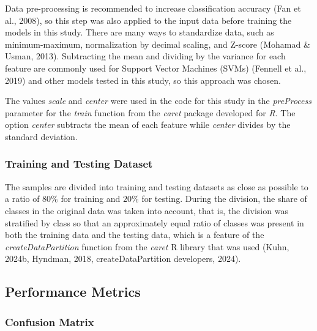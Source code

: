 \documentclass[sn-mathphys-num]{sn-jnl}%
\begin{document}
Data pre-processing is recommended to increase classification accuracy (Fan et al., 2008), so this step was also applied to the input data before training the models in this study. There are many ways to standardize data, such as minimum-maximum, normalization by decimal scaling, and Z-score (Mohamad & Usman, 2013). Subtracting the mean and dividing by the variance for each feature are commonly used for Support Vector Machines (SVMs) (Fennell et al., 2019) and other models tested in this study, so this approach was chosen. 

The values \textit{scale} and \textit{center} were used in the code for this study in the \textit{preProcess} parameter for the \textit{train} function from the \textit{caret} package developed for \textit{R}. The option \textit{center} subtracts the mean of each feature while \textit{center} divides by the standard deviation. 

\subsubsection{Training and Testing Dataset}

The samples are divided into training and testing datasets as close as possible to a ratio of $80\%$ for training and $20\%$ for testing. During the division, the share of classes in the original data was taken into account, that is, the division was stratified by class so that an approximately equal ratio of classes was present in both the training data and the testing data, which is a feature of the \textit{createDataPartition} function from the \textit{caret} R library that was used (Kuhn, 2024b, Hyndman, 2018, createDataPartition developers, 2024).

\subsection{Performance Metrics}

\subsubsection{Confusion Matrix}
\end{document}
